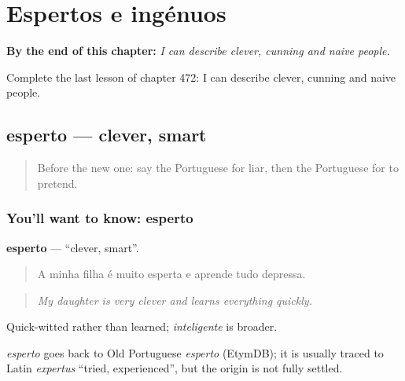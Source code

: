 
\chapter{Espertos e ingénuos}
\label{ch:pt-espertos-e-ingenuos}

\begin{chapteropening}
\textbf{By the end of this chapter:} \emph{I can describe clever, cunning and naive people.}

Complete the last lesson of chapter 472: I can describe clever, cunning and naive people.
\end{chapteropening}

\section[esperto]{esperto — clever, smart}

\label{lesson:PT-C472-esperto}



\begin{quote}
Before the new one: say the Portuguese for liar, then the Portuguese for to pretend.
\end{quote}

\subsection*{You'll want to know: esperto}
\textbf{esperto} — \textquotedblleft{}clever, smart\textquotedblright{}.

\begin{quote}
A minha filha é muito esperta e aprende tudo depressa.
\end{quote}

\begin{quote}
\emph{My daughter is very clever and learns everything quickly.}
\end{quote}

Quick-witted rather than learned; \emph{inteligente} is broader.

\begin{cousinweb}
\emph{esperto} goes back to Old Portuguese \emph{esperto} (EtymDB); it is usually traced to Latin \emph{expertus} \textquotedblleft{}tried, experienced\textquotedblright{}, but the origin is not fully settled.
\end{cousinweb}

